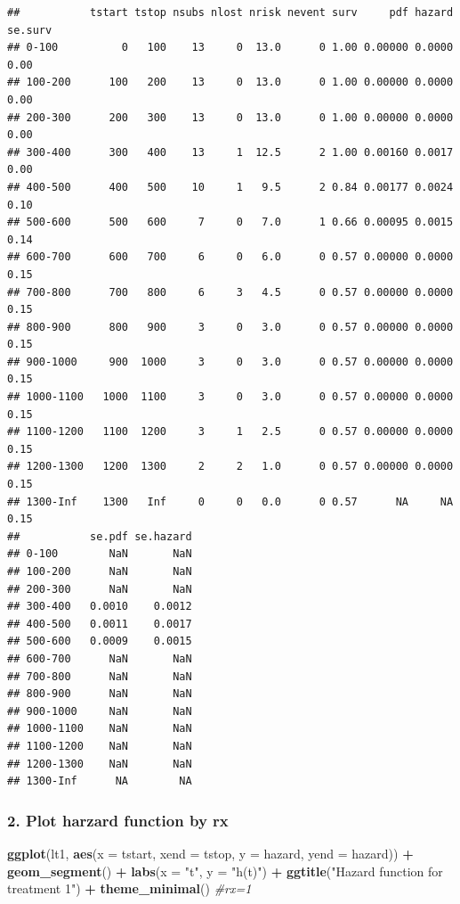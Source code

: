 \documentclass[
]{article}
\newenvironment{Shaded}{\begin{snugshade}}{\end{snugshade}}
\newcommand{\AttributeTok}[1]{\textcolor[rgb]{0.13,0.29,0.53}{#1}}
\newcommand{\CommentTok}[1]{\textcolor[rgb]{0.56,0.35,0.01}{\textit{#1}}}
\newcommand{\FunctionTok}[1]{\textcolor[rgb]{0.13,0.29,0.53}{\textbf{#1}}}
\newcommand{\NormalTok}[1]{#1}
\newcommand{\SpecialCharTok}[1]{\textcolor[rgb]{0.81,0.36,0.00}{\textbf{#1}}}
\newcommand{\StringTok}[1]{\textcolor[rgb]{0.31,0.60,0.02}{#1}}
\begin{document}
\begin{verbatim}
##           tstart tstop nsubs nlost nrisk nevent surv     pdf hazard se.surv
## 0-100          0   100    13     0  13.0      0 1.00 0.00000 0.0000    0.00
## 100-200      100   200    13     0  13.0      0 1.00 0.00000 0.0000    0.00
## 200-300      200   300    13     0  13.0      0 1.00 0.00000 0.0000    0.00
## 300-400      300   400    13     1  12.5      2 1.00 0.00160 0.0017    0.00
## 400-500      400   500    10     1   9.5      2 0.84 0.00177 0.0024    0.10
## 500-600      500   600     7     0   7.0      1 0.66 0.00095 0.0015    0.14
## 600-700      600   700     6     0   6.0      0 0.57 0.00000 0.0000    0.15
## 700-800      700   800     6     3   4.5      0 0.57 0.00000 0.0000    0.15
## 800-900      800   900     3     0   3.0      0 0.57 0.00000 0.0000    0.15
## 900-1000     900  1000     3     0   3.0      0 0.57 0.00000 0.0000    0.15
## 1000-1100   1000  1100     3     0   3.0      0 0.57 0.00000 0.0000    0.15
## 1100-1200   1100  1200     3     1   2.5      0 0.57 0.00000 0.0000    0.15
## 1200-1300   1200  1300     2     2   1.0      0 0.57 0.00000 0.0000    0.15
## 1300-Inf    1300   Inf     0     0   0.0      0 0.57      NA     NA    0.15
##           se.pdf se.hazard
## 0-100        NaN       NaN
## 100-200      NaN       NaN
## 200-300      NaN       NaN
## 300-400   0.0010    0.0012
## 400-500   0.0011    0.0017
## 500-600   0.0009    0.0015
## 600-700      NaN       NaN
## 700-800      NaN       NaN
## 800-900      NaN       NaN
## 900-1000     NaN       NaN
## 1000-1100    NaN       NaN
## 1100-1200    NaN       NaN
## 1200-1300    NaN       NaN
## 1300-Inf      NA        NA
\end{verbatim}

\hypertarget{plot-harzard-function-by-rx}{%
\subsubsection{2. Plot harzard function by
rx}\label{plot-harzard-function-by-rx}}

\begin{Shaded}
\begin{Highlighting}[]
\FunctionTok{ggplot}\NormalTok{(lt1, }\FunctionTok{aes}\NormalTok{(}\AttributeTok{x =}\NormalTok{ tstart, }\AttributeTok{xend =}\NormalTok{ tstop, }\AttributeTok{y =}\NormalTok{ hazard, }\AttributeTok{yend =}\NormalTok{ hazard)) }\SpecialCharTok{+}
  \FunctionTok{geom\_segment}\NormalTok{() }\SpecialCharTok{+}
  \FunctionTok{labs}\NormalTok{(}\AttributeTok{x =} \StringTok{"t"}\NormalTok{, }\AttributeTok{y =} \StringTok{"h(t)"}\NormalTok{) }\SpecialCharTok{+}
  \FunctionTok{ggtitle}\NormalTok{(}\StringTok{"Hazard function for treatment 1"}\NormalTok{) }\SpecialCharTok{+}
  \FunctionTok{theme\_minimal}\NormalTok{() }\CommentTok{\#rx=1}
\end{Highlighting}
\end{Shaded}
\end{document}
